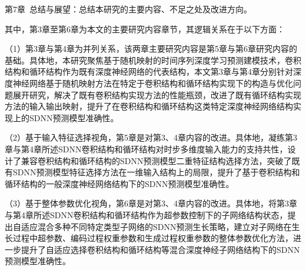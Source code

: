 第7章~总结与展望：总结本研究的主要内容、不足之处及改进方向。

其中，第3章至第6章为本文的主要研究内容章节，其逻辑关系在于以下方面：

（1）第3章与第4章为并列关系，该两章主要研究内容是第5章与第6章研究内容的基础。具体地，本研究聚焦基于随机映射的时间序列深度学习预测建模技术，卷积结构和循环结构作为既有深度神经网络的代表结构，本文第3章与第4章分别针对深度神经网络基于随机映射方法在特定于卷积结构和循环结构实现下的构造与优化问题展开研究，解决了既有卷积结构实现方法的性能瓶颈，改进了既有循环结构实现方法的输入输出映射，提升了在卷积结构和循环结构这类特定深度神经网络结构实现上的SDNN预测模型准确性。

（2）基于输入特征选择视角，第5章是对第3、4章内容的改进。具体地，凝练第3章与第4章所述SDNN卷积结构和循环结构对时步多维度输入能力的支持共性，设计了兼容卷积结构和循环结构的SDNN预测模型二重特征结构选择方法，突破了既有SDNN预测模型特征选择方法在一维输入结构上的局限，提升了基于卷积结构和循环结构的一般深度神经网络结构下的SDNN预测模型准确性。

（3）基于整体参数优化视角，第6章是对第3、4章内容的改进。具体地，将第3章与第4章所述SDNN卷积结构和循环结构作为超参数控制下的子网络结构状态，提出自适应混合多种不同特定类型子网络的SDNN预测生长策略，建立对子网络在生长过程中超参数、编码过程权重参数和生成过程权重参数的整体参数优化方法，进一步提升了自适应选择卷积结构和循环结构等混合深度神经子网络结构下的SDNN预测模型准确性。







